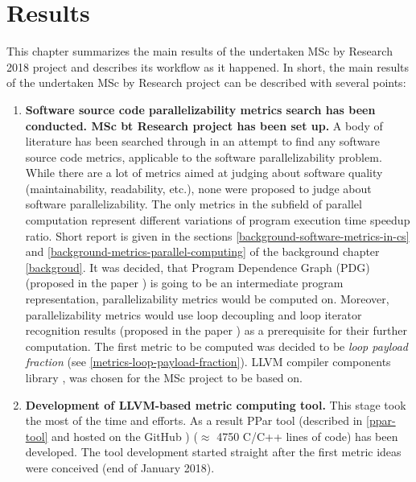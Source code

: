 \chapter{Results}
\label{results}
\qquad This chapter summarizes the main results of the undertaken MSc by Research 2018 project and describes its workflow as it happened. In short, the main results of the undertaken MSc by Research project can be described with several points:
\begin{enumerate}[align=left,leftmargin=*]
\item \textbf{Software source code parallelizability metrics search has been conducted. MSc bt Research project has been set up.}\newline
\null\qquad A body of literature has been searched through in an attempt to find any software source code metrics, applicable to the software parallelizability problem. While there are a lot of metrics aimed at judging about software quality (maintainability, readability, etc.), none were proposed to judge about software parallelizability. The only metrics in the subfield of parallel computation represent different variations of program execution time speedup ratio. Short report is given in the sections \ref{background-software-metrics-in-cs} and \ref{background-metrics-parallel-computing} of the background chapter \ref{backgroud}.\newline
\null\qquad It was decided, that Program Dependence Graph (PDG) (proposed in the paper \cite{pdg-paper}) is going to be an intermediate program representation, parallelizability metrics would be computed on. Moreover, parallelizability metrics would use loop decoupling and loop iterator recognition results (proposed in the paper \cite{iterator-recognition-paper}) as a prerequisite for their further computation. The first metric to be computed was decided to be \textit{loop payload fraction} (see \ref{metrics-loop-payload-fraction}). LLVM compiler components library \cite{llvm-official-website},\cite{llvm-paper} was chosen for the MSc project to be based on.	
\item \textbf{Development of LLVM-based metric computing tool.}\newline 
\null\qquad This stage took the most of the time and efforts. As a result PPar tool (described in \ref{ppar-tool} and hosted on the GitHub \cite{ppar-tool}) ($\approx$ 4750 C/C++ lines of code) has been developed. The tool development started straight after the first metric ideas were conceived (end of January 2018).\newline

\end{enumerate}
